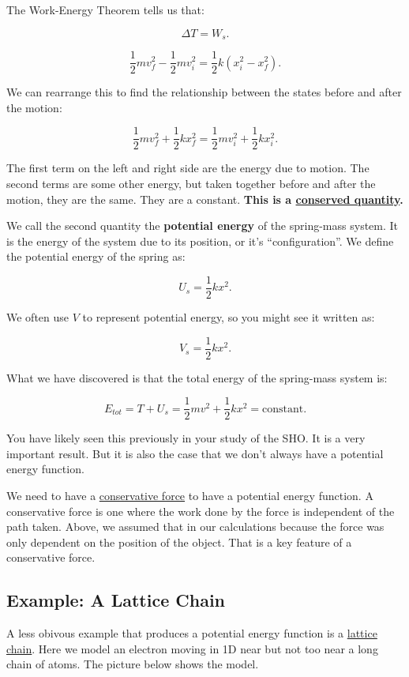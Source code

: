 \documentclass[11pt]{article}
\begin{document}
The Work-Energy Theorem tells us that:

\[\Delta T = W_s.\]

\[\dfrac{1}{2}mv_f^2 - \dfrac{1}{2}mv_i^2 = \dfrac{1}{2}k(x_i^2 - x_f^2).\]

We can rearrange this to find the relationship between the states before
and after the motion:

\[\dfrac{1}{2}mv_f^2 + \dfrac{1}{2}k x_f^2 = \dfrac{1}{2}mv_i^2 + \dfrac{1}{2}k x_i^2.\]

The first term on the left and right side are the energy due to motion.
The second terms are some other energy, but taken together before and
after the motion, they are the same. They are a constant. \textbf{This
is a
\href{https://en.wikipedia.org/wiki/Mass\%E2\%80\%93energy_equivalence\#Conservation_of_mass_and_energy}{conserved
quantity}.}

We call the second quantity the \textbf{potential energy} of the
spring-mass system. It is the energy of the system due to its position,
or it's ``configuration''. We define the potential energy of the spring
as:

\[U_s = \dfrac{1}{2}kx^2.\]

We often use \(V\) to represent potential energy, so you might see it
written as:

\[V_s = \dfrac{1}{2}kx^2.\]

What we have discovered is that the total energy of the spring-mass
system is:

\[E_{tot} = T + U_s = \dfrac{1}{2}mv^2 + \dfrac{1}{2}kx^2 = \text{constant}.\]

You have likely seen this previously in your study of the SHO. It is a
very important result. But it is also the case that we don't always have
a potential energy function.

We need to have a
\href{https://en.wikipedia.org/wiki/Conservative_force}{conservative
force} to have a potential energy function. A conservative force is one
where the work done by the force is independent of the path taken.
Above, we assumed that in our calculations because the force was only
dependent on the position of the object. That is a key feature of a
conservative force.

    \subsection{Example: A Lattice Chain}\label{example-a-lattice-chain}

A less obivous example that produces a potential energy function is a
\href{https://en.wikipedia.org/wiki/Lattice_chain}{lattice chain}. Here
we model an electron moving in 1D near but not too near a long chain of
atoms. The picture below shows the model.
\end{document}
